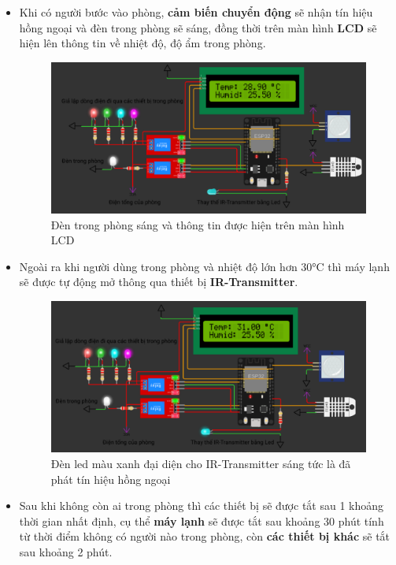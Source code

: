 \documentclass{report}
\begin{document}
\begin{itemize}
    \pagebreak
    \item Khi có người bước vào phòng, \textbf{cảm biến chuyển động} sẽ nhận tín hiệu hồng ngoại và đèn trong phòng sẽ sáng, đồng thời trên màn hình \textbf{LCD} sẽ hiện lên thông tin về nhiệt độ, độ ẩm trong phòng.

    \begin{figure}[!h]
        \centering
        \includegraphics[width=\textwidth, keepaspectratio]{img/vao_phong.png}
        \caption{Đèn trong phòng sáng và thông tin được hiện trên màn hình LCD}
    \end{figure}

    \pagebreak
    \item Ngoài ra khi người dùng trong phòng và nhiệt độ lớn hơn 30°C thì máy lạnh sẽ được tự động mở thông qua thiết bị \textbf{IR-Transmitter}.

    \begin{figure}[!h]
        \centering
        \includegraphics[width=\textwidth, keepaspectratio]{img/mlanh_mo.png}
        \caption{Đèn led màu xanh đại diện cho IR-Transmitter sáng tức là đã phát tín hiệu hồng ngoại}
    \end{figure}

    \item Sau khi không còn ai trong phòng thì các thiết bị sẽ được tắt sau 1 khoảng thời gian nhất định, cụ thể  \textbf{máy lạnh} sẽ được tắt sau khoảng 30 phút tính từ thời điểm không có người nào trong phòng, còn \textbf{các thiết bị khác} sẽ tắt sau khoảng 2 phút.


\end{itemize}
\end{document}
